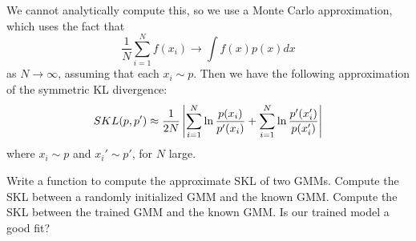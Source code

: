 We cannot analytically compute this, so we use a Monte Carlo approximation, which uses the fact that 
\begin{equation*}
\frac{1}{N} \sum_{i=1}^{N} f(x_{i}) \rightarrow \int f(x) p(x) dx
\end{equation*}
as $N \rightarrow \infty$, assuming that each $x_{i} \sim p$. Then we have the following approximation of the symmetric KL divergence:
\begin{equation*}
SKL(p,p') \approx \frac{1}{2N} \left\lvert\sum_{i=1}^{N} \ln \frac{p(x_{i})}{p'(x_{i})} + \sum_{i=1}^{N} \ln \frac{p'(x_{i}')}{p(x_{i}')}\right\rvert
\end{equation*}
where $x_{i} \sim p$ and $x_{i}' \sim p'$, for $N$ large.

\begin{problem}
Write a function to compute the approximate SKL of two GMMs. Compute the SKL between a randomly initialized GMM and the known GMM. Compute the SKL between the trained GMM and the known GMM. Is our trained model a good fit?
\end{problem}